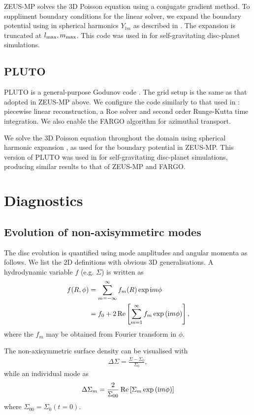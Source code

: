 ZEUS-MP solves the 3D Poisson equation using a conjugate gradient
method. To suppliment boundary conditions for the linear solver, we
expand the boundary potential using in spherical harmonics $Y_{lm}$ 
as described in \cite{boss80}. The expansion is truncated at
$l_\mathrm{max},m_\mathrm{max}$. This code was used in \cite{lin12b} for
self-gravitating disc-planet simulations.  

\subsection{PLUTO} 
PLUTO is a general-purpose Godunov code \citep{mignone07}. The grid
setup is the same as that adopted in ZEUS-MP above. We configure the
code similarly to that used in \cite{lin14}: piecewise linear
reconstruction, a Roe solver and second order Runge-Kutta time
integration. We also enable the FARGO algorithm for azimuthal
transport. 

We solve the 3D Poisson equation throughout the domain using spherical
harmonic expansion \citep{boss80}, as used for the boundary potential
in ZEUS-MP. This version of PLUTO was used in \cite{lin14b} for
self-gravitating disc-planet simulations, producing similar results to
that of ZEUS-MP and FARGO. 


\section{Diagnostics}
 
\subsection{Evolution of non-axisymmetirc modes}
The disc evolution is quantified using mode amplitudes and angular
momenta as follows. We list the 2D definitions with obvious 3D generalisations. 
A hydrodynamic variable $f$ (e.g. $\Sigma$) is written as 
\begin{align}
  f(R,\phi) &= \sum_{m=-\infty}^{\infty}f_m(R)\exp{\mathrm{i}m \phi} \notag\\
  &= f_0 + 2 \operatorname{Re}\left[\sum_{m=1}^\infty f_m \exp{(\mathrm{i}m\phi)}\right], 
\end{align}
where the $f_m$ may be obtained from Fourier transform in $\phi$. 

The non-axisymmetric surface density can be visualised with
\begin{align}
  \Delta \Sigma = \frac{\Sigma - \Sigma_{0}}{\Sigma_{0}}, 
\end{align}
while an individual mode as
\begin{align}
  \Delta\Sigma_m = \frac{2}{\Sigma_{00}} \operatorname{Re}\left[\Sigma_m \exp{(\mathrm{i}m\phi)}\right]
	\end{align}
where $\Sigma_{00} = \Sigma_0(t=0)$.  


